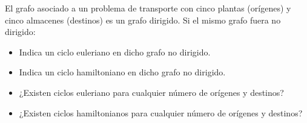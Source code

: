 

El grafo asociado a un problema de transporte con cinco plantas (orígenes) y cinco almacenes (destinos) es un grafo dirigido. Si el mismo grafo fuera no dirigido:
\begin{itemize}
    \item Indica un ciclo euleriano en dicho grafo no dirigido.
    \item Indica un ciclo hamiltoniano en dicho grafo no dirigido.
    \item ¿Existen ciclos euleriano para cualquier número de orígenes y destinos?
    \item ¿Existen ciclos hamiltonianos para cualquier número de orígenes y destinos?

\end{itemize}